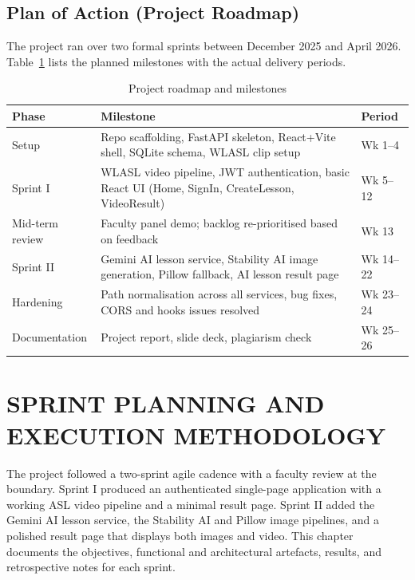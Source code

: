 \documentclass[12pt,a4paper,oneside]{report}
\begin{document}
\section{Plan of Action (Project Roadmap)}

The project ran over two formal sprints between December 2025 and April 2026. Table~\ref{tab:roadmap} lists the planned milestones with the actual delivery periods.

\begin{table}[h]
\caption{Project roadmap and milestones}
\label{tab:roadmap}
\centering
\small
\begin{tabularx}{\linewidth}{@{}lXl@{}}
\toprule
\textbf{Phase} & \textbf{Milestone} & \textbf{Period} \\
\midrule
Setup     & Repo scaffolding, FastAPI skeleton, React+Vite shell, SQLite schema, WLASL clip setup & Wk 1--4 \\
Sprint I  & WLASL video pipeline, JWT authentication, basic React UI (Home, SignIn, CreateLesson, VideoResult) & Wk 5--12 \\
Mid-term review & Faculty panel demo; backlog re-prioritised based on feedback & Wk 13 \\
Sprint II & Gemini AI lesson service, Stability AI image generation, Pillow fallback, AI lesson result page & Wk 14--22 \\
Hardening & Path normalisation across all services, bug fixes, CORS and hooks issues resolved & Wk 23--24 \\
Documentation & Project report, slide deck, plagiarism check & Wk 25--26 \\
\bottomrule
\end{tabularx}
\end{table}

\chapter{SPRINT PLANNING AND EXECUTION METHODOLOGY}

The project followed a two-sprint agile cadence with a faculty review at the boundary. Sprint I produced an authenticated single-page application with a working ASL video pipeline and a minimal result page. Sprint II added the Gemini AI lesson service, the Stability AI and Pillow image pipelines, and a polished result page that displays both images and video. This chapter documents the objectives, functional and architectural artefacts, results, and retrospective notes for each sprint.
\end{document}
